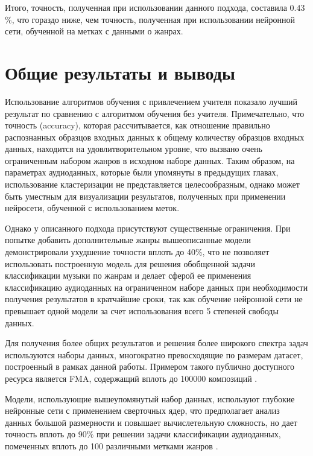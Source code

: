 Итого, точность, полученная при использовании данного подхода, составила $0.43$\%, что гораздо ниже, чем точность, полученная при использовании нейронной сети, обученной на метках с данными о жанрах.

\chapter{Общие результаты и выводы}

Использование алгоритмов обучения с привлечением учителя показало лучший результат по сравнению с алгоритмом обучения без учителя.
Примечательно, что точность (accuracy), которая рассчитывается, как отношение правильно распознанных образцов входных данных к общему количеству образцов входных данных, находится на удовлитворительном уровне, что вызвано
очень ограниченным набором жанров в исходном наборе данных. Таким образом, на параметрах аудиоданных, которые были упомянуты в предыдущих главах, использование кластеризации не представляется целесообразным, однако может быть уместным для визуализации результатов, полученных при применении нейросети, обученной с использованием меток.

Однако у описанного подхода присутствуют существенные ограничения. При попытке добавить дополнительные жанры вышеописанные модели демонстрировали ухудшение точности вплоть до 40\%, что
не позволяет использовать построенную модель для решения обобщенной задачи классификации музыки по жанрам и делает сферой ее применения
классификацию аудиоданных на ограниченном наборе данных при необходимости получения результатов в кратчайшие сроки, так как обучение нейронной сети не превышает одной модели за счет использования всего 5 степеней свободы данных.

Для получения более общих результатов и решения более широкого спектра задач используются наборы данных, многократно превосходящие
по размерам датасет, построенный в рамках данной работы. Примером такого публично доступного ресурса является FMA, содержащий вплоть до 100000 композиций \cite{fma}.

Модели, использующие вышеупомянутый набор данных, используют глубокие нейронные сети с применением сверточных ядер, что предполагает анализ данных большой размерности и повышает вычислетельную сложность, но дает
точность вплоть до 90\% при решении задачи классификации аудиоданных, помеченных вплоть до 100 различными метками жанров \cite{zero} \cite{kim}.


